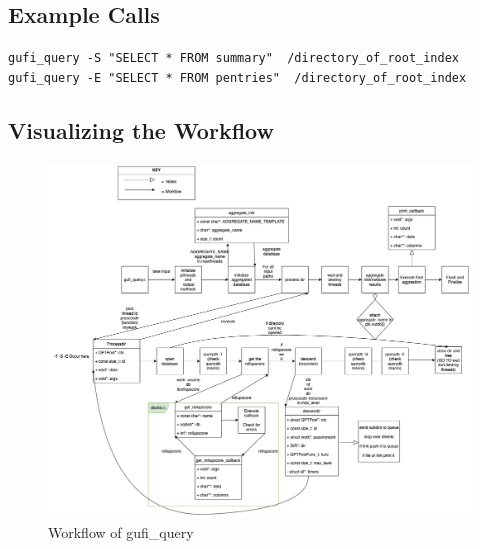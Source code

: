 \clearpage

\subsection{Example Calls}

\texttt{gufi\_query -S "SELECT * FROM summary" ~/directory\_of\_root\_index}
\\
\texttt{gufi\_query -E "SELECT * FROM pentries" ~/directory\_of\_root\_index}

\subsection{Visualizing the Workflow}
\begin{figure} [h]
\centering
\includegraphics[width=1.0\textwidth]{images/gufi_query.png}
\caption{\label{fig:gufi_query}Workflow of gufi\_query}
\end{figure}

